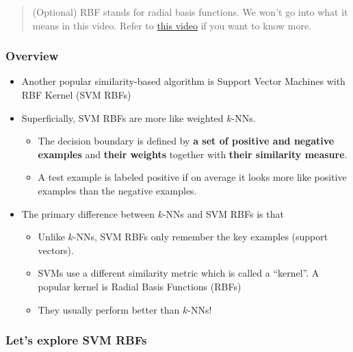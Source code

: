 \documentclass[11pt]{article}
\providecommand{\tightlist}{%
      \setlength{\itemsep}{0pt}\setlength{\parskip}{0pt}}
\begin{document}
\begin{quote}
(Optional) RBF stands for radial basis functions. We won't go into what
it means in this video. Refer to
\href{https://www.youtube.com/watch?v=Qc5IyLW_hns}{this video} if you
want to know more.
\end{quote}

    \subsubsection{Overview}\label{overview}

\begin{itemize}
\tightlist
\item
  Another popular similarity-based algorithm is Support Vector Machines
  with RBF Kernel (SVM RBFs)
\item
  Superficially, SVM RBFs are more like weighted \(k\)-NNs.

  \begin{itemize}
  \tightlist
  \item
    The decision boundary is defined by \textbf{a set of positive and
    negative examples} and \textbf{their weights} together with
    \textbf{their similarity measure}.
  \item
    A test example is labeled positive if on average it looks more like
    positive examples than the negative examples.
  \end{itemize}
\end{itemize}

    \begin{itemize}
\tightlist
\item
  The primary difference between \(k\)-NNs and SVM RBFs is that

  \begin{itemize}
  \tightlist
  \item
    Unlike \(k\)-NNs, SVM RBFs only remember the key examples (support
    vectors).
  \item
    SVMs use a different similarity metric which is called a ``kernel''.
    A popular kernel is Radial Basis Functions (RBFs)
  \item
    They usually perform better than \(k\)-NNs!
  \end{itemize}
\end{itemize}

    \subsubsection{Let's explore SVM RBFs}\label{lets-explore-svm-rbfs}
\end{document}
